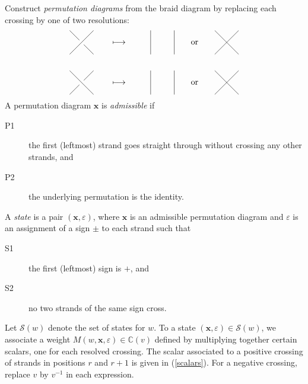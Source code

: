 \documentclass [12pt, letterpaper, oneside] {amsart}
\newcommand \e {\varepsilon}
\newcommand \mc {\mathcal}
\newcommand \mB {\mathbb}
\newcommand \mb {\mathbf}
\theoremstyle {plain}
\begin{document}
Construct \emph {permutation diagrams} from the braid diagram by replacing each crossing by one of two resolutions:
\begin {eqnarray*}
\vcenter{
\xy
(0,0);(10,10)**@{-},
(10,0);(6,4)**@{-},
(4,6);(0,10)**@{-}
\endxy
} \qquad &\longmapsto& \qquad \vcenter{
\xy
(0,0);(0,10)**@{-},
(10,0);(10,10)**@{-}
\endxy
} \qquad \text{or} \qquad \vcenter{
\xy
(0,0);(10,10)**@{-},
(10,0);(0,10)**@{-}
\endxy
} \\ \\
\vcenter{
\xy
(0,0);(4,4)**@{-},
(6,6);(10,10)**@{-},
(10,0);(0,10)**@{-}
\endxy
} \qquad &\longmapsto& \qquad \vcenter{
\xy
(0,0);(0,10)**@{-},
(10,0);(10,10)**@{-}
\endxy
} \qquad \text{or} \qquad \vcenter{
\xy
(0,0);(10,10)**@{-},
(10,0);(0,10)**@{-}
\endxy
}
\end {eqnarray*}
A permutation diagram $\mb{x}$ is \emph {admissible} if
\begin {description}
\item [P1] the first (leftmost) strand goes straight through without crossing any other strands, and
\item [P2] the underlying permutation is the identity.
\end {description}
A \emph{state} is a pair $(\mb{x},\e)$, where $\mb{x}$ is an admissible permutation diagram and $\e$ is an assignment of a sign $\pm$ to each strand 
such that
\begin {description}
\item [S1] the first (leftmost) sign is $+$, and
\item [S2] no two strands of the same sign cross.
\end {description}
Let $\mc{S}(w)$ denote the set of states for $w$.  To a state $(\mb{x},\e) \in \mc{S}(w)$, we associate a weight $M(w, \mb{x}, \e) \in \mB{C}(v)$ defined by multiplying together
certain scalars, one for each resolved crossing.  The scalar associated to a positive crossing of strands in positions $r$ and $r+1$ is given in (\ref{scalars}).  For a negative crossing, replace $v$ by $v^{-1}$ in each expression.
\end{document}

